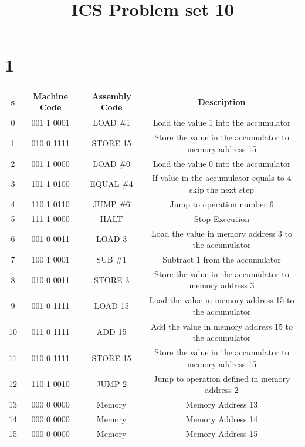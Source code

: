 \documentclass{article}
\begin{document}
    
    \title{\textbf{ICS Problem set 10}}
    \maketitle

    \section{1}
    \begin{center}
        \begin{tabular}{ | c | c | c | c | }
            \hline
            s & Machine Code & Assembly Code & Description \\
            \hline
            0 & 001 1 0001 & LOAD \#1 & Load the value 1 into the accumulator \\
            \hline
            1 & 010 0 1111 & STORE 15 & Store the value in the accumulator to memory address 15 \\
            \hline
            2 & 001 1 0000 & LOAD \#0 & Load the value 0 into the accumulator \\
            \hline
            3 & 101 1 0100 & EQUAL \#4 & If value in the accumulator equals to 4 skip the next step \\
            \hline
            4 & 110 1 0110 & JUMP \#6 & Jump to operation number 6 \\
            \hline
            5 & 111 1 0000 & HALT & Stop Execution \\
            \hline
            6 & 001 0 0011 & LOAD 3 & Load the value in memory address 3 to the accumulator \\
            \hline
            7 & 100 1 0001 & SUB \#1 & Subtract 1 from the accumulator \\
            \hline
            8 & 010 0 0011 & STORE 3 & Store the value in the accumulator to memory address 3 \\
            \hline
            9 & 001 0 1111 & LOAD 15 & Load the value in memory address 15 to the accumulator \\
            \hline
            10 & 011 0 1111 & ADD 15 & Add the value in memory address 15 to the accumulator \\
            \hline
            11 & 010 0 1111 & STORE 15 & Store the value in the accumulator to memory address 15 \\
            \hline
            12 & 110 1 0010 & JUMP 2 & Jump to operation defined in memory address 2 \\
            \hline
            13 & 000 0 0000 & Memory & Memory Address 13 \\
            \hline
            14 & 000 0 0000 & Memory & Memory Address 14 \\
            \hline
            15 & 000 0 0000 & Memory & Memory Address 15 \\
            \hline
        \end{tabular}
    \end{center}
\end{document}
